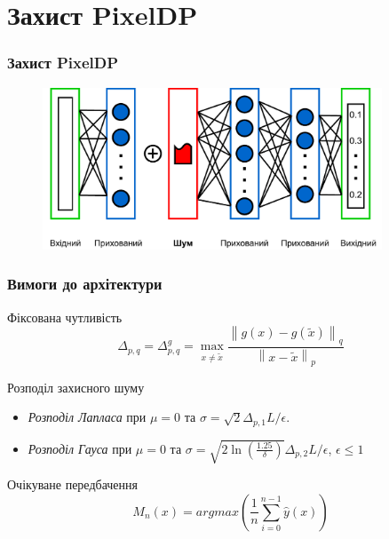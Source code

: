 \documentclass{beamer}
\numberwithin{equation}{section}
\begin{document}
	\section{Захист PixelDP}
	\begin{frame}
		\frametitle{Захист PixelDP}
		
		\begin{figure}[h]
			\centering
			\includegraphics[width=0.9\textwidth]{../images/diagrams-PixelDP-small-p.pdf}
			
		\end{figure}
	\end{frame}

	\begin{frame}
		\frametitle{Вимоги до архітектури}
		\begin{block}{Фіксована чутливість}
			 \begin{equation}
				\label{sensitivity}
				\Delta_{p, q}=\Delta_{p, q}^{g}=\max _{x \neq \tilde{x}} \frac{\left\|g(x)-g\left(\tilde{x}\right)\right\|_{q}}{\left\|x-\tilde{x}\right\|_{p}}
			\end{equation}
		\end{block}
	\vspace{0.3cm}
		\begin{block}{Розподіл захисного шуму}
			 \begin{itemize}
				\item \textit{Розподіл Лапласа} при $\mu = 0$ та $\sigma=\sqrt{2} \Delta_{p, 1} L / \epsilon$. 
				\item \textit{Розподіл Гауса} при $\mu = 0$ та $\sigma=\sqrt{2 \ln \left(\frac{1.25}{\delta}\right)} \Delta_{p, 2} L / \epsilon$, $\epsilon \leq 1$
			\end{itemize}
		\end{block}
	\vspace{0.3cm}
		\begin{block}{Очікуване передбачення}
			\begin{equation}
				M_n(x) = argmax\left(\frac{1}{n}\sum\limits_{i = 0}^{n-1}\hat{y}(x)\right)
			\end{equation}
		\end{block}
	    
	\end{frame}
\end{document}
